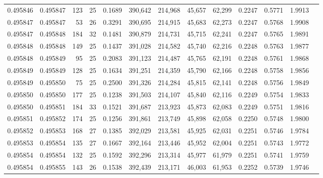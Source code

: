 \begin{tabular}{rrrrrrrrrrrrr}
0.495846 & 0.495847 & 123 &  25 &                                     0.1689 & 390,642 & 214,968 &  45,657 &  62,299 & 0.2247 & 0.5771 & 1.9913 \\
0.495847 & 0.495847 &  53 &  26 &                                     0.3291 & 390,695 & 214,915 &  45,683 &  62,273 & 0.2247 & 0.5768 & 1.9908 \\
0.495847 & 0.495848 & 184 &  32 &                                     0.1481 & 390,879 & 214,731 &  45,715 &  62,241 & 0.2247 & 0.5765 & 1.9891 \\
0.495848 & 0.495848 & 149 &  25 &                                     0.1437 & 391,028 & 214,582 &  45,740 &  62,216 & 0.2248 & 0.5763 & 1.9877 \\
0.495848 & 0.495849 &  95 &  25 &                                     0.2083 & 391,123 & 214,487 &  45,765 &  62,191 & 0.2248 & 0.5761 & 1.9868 \\
0.495849 & 0.495849 & 128 &  25 &                                     0.1634 & 391,251 & 214,359 &  45,790 &  62,166 & 0.2248 & 0.5758 & 1.9856 \\
0.495849 & 0.495850 &  75 &  25 &                                     0.2500 & 391,326 & 214,284 &  45,815 &  62,141 & 0.2248 & 0.5756 & 1.9849 \\
0.495850 & 0.495850 & 177 &  25 &                                     0.1238 & 391,503 & 214,107 &  45,840 &  62,116 & 0.2249 & 0.5754 & 1.9833 \\
0.495850 & 0.495851 & 184 &  33 &                                     0.1521 & 391,687 & 213,923 &  45,873 &  62,083 & 0.2249 & 0.5751 & 1.9816 \\
0.495851 & 0.495852 & 174 &  25 &                                     0.1256 & 391,861 & 213,749 &  45,898 &  62,058 & 0.2250 & 0.5748 & 1.9800 \\
0.495852 & 0.495853 & 168 &  27 &                                     0.1385 & 392,029 & 213,581 &  45,925 &  62,031 & 0.2251 & 0.5746 & 1.9784 \\
0.495853 & 0.495854 & 135 &  27 &                                     0.1667 & 392,164 & 213,446 &  45,952 &  62,004 & 0.2251 & 0.5743 & 1.9772 \\
0.495854 & 0.495854 & 132 &  25 &                                     0.1592 & 392,296 & 213,314 &  45,977 &  61,979 & 0.2251 & 0.5741 & 1.9759 \\
0.495854 & 0.495855 & 143 &  26 &                                     0.1538 & 392,439 & 213,171 &  46,003 &  61,953 & 0.2252 & 0.5739 & 1.9746 \\

\end{tabular}
